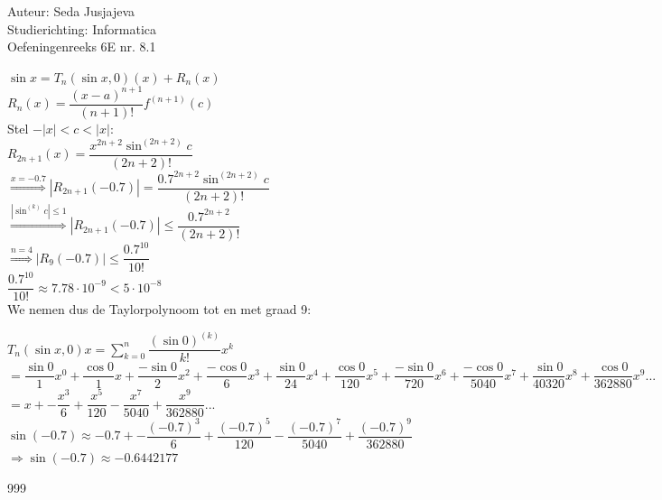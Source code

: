 \documentclass[a4paper]{article}
\begin{document}
\noindent \large Auteur: Seda Jusjajeva\\
\noindent \large Studierichting: Informatica\\
\noindent \large Oefeningenreeks 6E nr. 8.1\\

\medskip

\normalsize

$\sin x = T_n(\sin x,0)(x) + R_n(x)$ \\

$R_n(x) = \dfrac{(x - a)^{n + 1}}{(n + 1)!}f^{(n + 1)}(c)$ \\

Stel $-|x| < c < |x|$: \\

$R_{2n + 1}(x) = \dfrac{x^{2n + 2}\sin^{(2n + 2)}c}{(2n + 2)!}$ \\

$\overset{x = -0.7}\Rightarrow |R_{2n + 1}(-0.7)| = \dfrac{0.7^{2n + 2}\sin^{(2n + 2)}c}{(2n + 2)!}$ \\

$\overset{|\sin^{(k)}c| \le 1}\Rightarrow |R_{2n+1}(-0.7)| \le \dfrac{0.7^{2n+2}}{(2n+2)!}$ \\

$\overset{n = 4}\Rightarrow |R_{9}(-0.7)| \le \dfrac{0.7^{10}}{10!}$ \\

$\dfrac{0.7^{10}}{10!} \approx 7.78 \cdot 10^{-9} < 5 \cdot 10^{-8}$ \\

We nemen dus de Taylorpolynoom tot en met graad 9:

$T_n(\sin x,0)x = \displaystyle\sum_{k = 0}^{n} \dfrac{(\sin 0)^{(k)}}{k!}x^k$ \\

$= \dfrac{\sin 0}{1}x^0 + \dfrac{\cos 0}{1}x + \dfrac{-\sin 0}{2}x^2 + \dfrac{-\cos 0}{6}x^3 + \dfrac{\sin 0}{24}x^4 + \dfrac{\cos 0}{120}x^5 + \dfrac{-\sin 0}{720}x^6 + \dfrac{-\cos 0}{5040}x^7 + \dfrac{\sin 0}{40320}x^8 + \dfrac{\cos 0}{362880}x^9 ...$ \\

$= x + -\dfrac{x^3}{6} + \dfrac{x^5}{120} - \dfrac{x^7}{5040} + \dfrac{x^9}{362880} ...$ \\

$\sin(-0.7) \approx -0.7 + -\dfrac{(-0.7)^3}{6} + \dfrac{(-0.7)^5}{120} - \dfrac{(-0.7)^7}{5040} + \dfrac{(-0.7)^9}{362880}$ \\

$\Rightarrow \sin(-0.7) \approx -0.6442177$ \\




\begin{thebibliography}{999}
\end{thebibliography}
\end{document}
